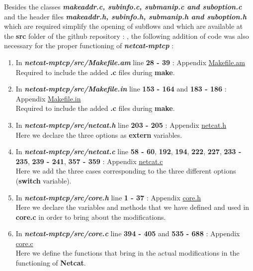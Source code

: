 \documentclass[a4paper,11pt]{article}
\begin{document}
			Besides the classes \textbf{\emph{makeaddr.c, subinfo.c, submanip.c and suboption.c}} and the header files \textbf{\emph{makeaddr.h, subinfo.h, submanip.h and suboption.h}} which are required simplify the opening of subflows and which are available at the \textbf{src} folder of the github repository : \cite[https://github.com/lawrenceFR/netcat-mptcp]{github}, the following addition of code was also necessary for the proper functioning of \textbf{\emph{netcat-mptcp}} :
			\begin{enumerate}
				\item In \textbf{\emph{netcat-mptcp/src/Makefile.am}} line \textbf{28 - 39} : Appendix \hyperref[subsec:Makefile.am]{Makefile.am} \\
				Required to include the added \textbf{.c} files during \textbf{make}.

				\item In \textbf{\emph{netcat-mptcp/src/Makefile.in}} line \textbf{153 - 164} and \textbf{183 - 186} : Appendix \hyperref[subsec:Makefile.in]{Makefile.in} \\
				Required to include the added \textbf{.c} files during \textbf{make}.

				\item In \textbf{\emph{netcat-mptcp/src/netcat.h}} line \textbf{203 - 205} : Appendix \hyperref[subsec:netcat.h]{netcat.h} \\
				Here we declare the three options as \textbf{extern} variables.

				\item In \textbf{\emph{netcat-mptcp/src/netcat.c}} line \textbf{58 - 60}, \textbf{192}, \textbf{194}, \textbf{222}, \textbf{227}, \textbf{233 - 235}, \textbf{239 - 241}, \textbf{357 - 359} : Appendix \hyperref[subsec:netcat.c]{netcat.c} \\
				Here we add the three cases corresponding to the three different options (\textbf{switch} variable).

				\item In \textbf{\emph{netcat-mptcp/src/core.h}} line \textbf{1 - 37} : Appendix \hyperref[subsec:core.h]{core.h} \\
				Here we declare the variables and methods that we have defined and used in \textbf{core.c} in order to bring about the modifications.

				\item In \textbf{\emph{netcat-mptcp/src/core.c}} line \textbf{394 - 405} and \textbf{535 - 688} : Appendix \hyperref[subsec:core.c]{core.c} \\
				Here we define the functions that bring in the actual modifications in the functioning of \textbf{Netcat}.
			\end{enumerate}
\end{document}
